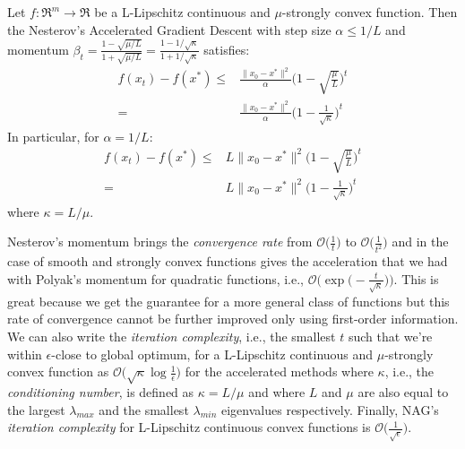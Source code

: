 \begin{theorem} \label{thm:str_cvx_nag_convergence}
Let $f: \Re^m \rightarrow \Re$ be a L-Lipschitz continuous and $\mu$-strongly convex function. Then the Nesterov's Accelerated Gradient Descent with step size $\alpha \leq 1/L$ and momentum $\beta_t = \displaystyle \frac{1 - \sqrt{\mu / L}}{1 + \sqrt{\mu / L}} = \frac{1-1/\sqrt{\kappa}}{1+1/\sqrt{\kappa}}$ satisfies:
$$
\begin{aligned}
	f(x_t) - f(x^*) \leq & \frac{\| x_0 - x^* \|^2}{\alpha} \Bigg(1 - \sqrt{\frac{\mu}{L}}\Bigg)^t \\
						= & \frac{\| x_0 - x^* \|^2}{\alpha} \Bigg(1 - \frac{1}{\sqrt{\kappa}}\Bigg)^t
\end{aligned}
$$
In particular, for $\alpha = 1/L$:
$$
\begin{aligned}
	f(x_t) - f(x^*) \leq & L \| x_0 - x^* \|^2 \Bigg(1 - \sqrt{\frac{\mu}{L}}\Bigg)^t \\
						= & L \| x_0 - x^* \|^2 \Bigg(1 - \frac{1}{\sqrt{\kappa}}\Bigg)^t
\end{aligned}
$$
where $\kappa = L/\mu$.
\end{theorem}


Nesterov's momentum brings the \emph{convergence rate} from $\displaystyle \mathcal{O}\Bigg(\frac{1}{t}\Bigg)$ to $\displaystyle \mathcal{O}\Bigg(\frac{1}{t^2}\Bigg)$ and in the case of smooth and strongly convex functions gives the acceleration that we had with Polyak’s momentum for quadratic functions, i.e., $\displaystyle \mathcal{O}\Bigg(\exp\Bigg(-\frac{t}{\sqrt{\kappa}}\Bigg)\Bigg)$. This is great because we get the guarantee for a more general class of functions but this rate of convergence cannot be further improved only using first-order information. We can also write the \emph{iteration complexity}, i.e., the smallest $t$ such that we’re within $\epsilon$-close to global optimum, for a L-Lipschitz continuous and $\mu$-strongly convex function as $\displaystyle \mathcal{O}\Bigg(\sqrt{\kappa}\log \frac{1}{\epsilon}\Bigg)$ for the accelerated methods where $\kappa$, i.e., the \emph{conditioning number}, is defined as $\kappa = L/\mu$ and where $L$ and $\mu$ are also equal to the largest $\lambda_{max}$ and the smallest $\lambda_{min}$ eigenvalues respectively. Finally, NAG's \emph{iteration complexity} for L-Lipschitz continuous convex functions is $\displaystyle \mathcal{O}\Bigg(\frac{1}{\sqrt{\epsilon}}\Bigg)$.

